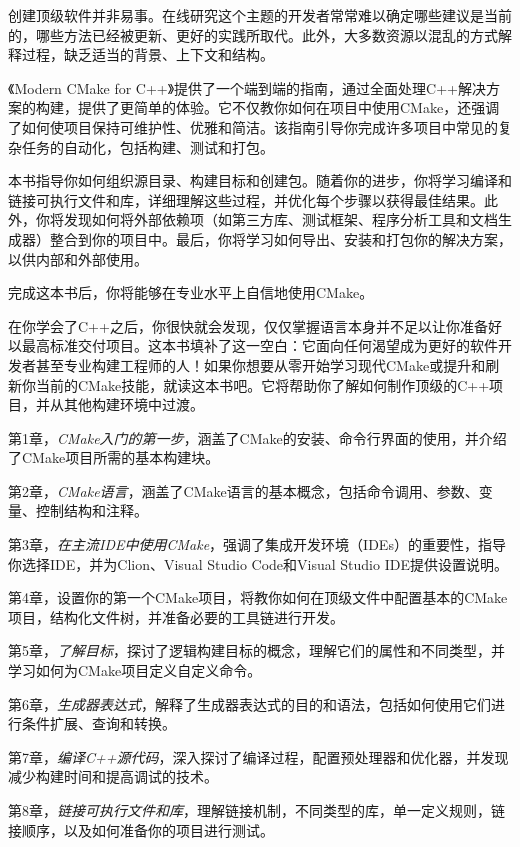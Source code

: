 


创建顶级软件并非易事。在线研究这个主题的开发者常常难以确定哪些建议是当前的，哪些方法已经被更新、更好的实践所取代。此外，大多数资源以混乱的方式解释过程，缺乏适当的背景、上下文和结构。

《Modern CMake for C++》提供了一个端到端的指南，通过全面处理C++解决方案的构建，提供了更简单的体验。它不仅教你如何在项目中使用CMake，还强调了如何使项目保持可维护性、优雅和简洁。该指南引导你完成许多项目中常见的复杂任务的自动化，包括构建、测试和打包。

本书指导你如何组织源目录、构建目标和创建包。随着你的进步，你将学习编译和链接可执行文件和库，详细理解这些过程，并优化每个步骤以获得最佳结果。此外，你将发现如何将外部依赖项（如第三方库、测试框架、程序分析工具和文档生成器）整合到你的项目中。最后，你将学习如何导出、安装和打包你的解决方案，以供内部和外部使用。

完成这本书后，你将能够在专业水平上自信地使用CMake。


在你学会了C++之后，你很快就会发现，仅仅掌握语言本身并不足以让你准备好以最高标准交付项目。这本书填补了这一空白：它面向任何渴望成为更好的软件开发者甚至专业构建工程师的人！如果你想要从零开始学习现代CMake或提升和刷新你当前的CMake技能，就读这本书吧。它将帮助你了解如何制作顶级的C++项目，并从其他构建环境中过渡。


第1章，\textit{CMake入门的第一步}，涵盖了CMake的安装、命令行界面的使用，并介绍了CMake项目所需的基本构建块。

第2章，\textit{CMake语言}，涵盖了CMake语言的基本概念，包括命令调用、参数、变量、控制结构和注释。

第3章，\textit{在主流IDE中使用CMake}，强调了集成开发环境（IDEs）的重要性，指导你选择IDE，并为Clion、Visual Studio Code和Visual Studio IDE提供设置说明。

第4章，设置你的第一个CMake项目，将教你如何在顶级文件中配置基本的CMake项目，结构化文件树，并准备必要的工具链进行开发。

第5章，\textit{了解目标}，探讨了逻辑构建目标的概念，理解它们的属性和不同类型，并学习如何为CMake项目定义自定义命令。

第6章，\textit{生成器表达式}，解释了生成器表达式的目的和语法，包括如何使用它们进行条件扩展、查询和转换。

第7章，\textit{编译C++源代码}，深入探讨了编译过程，配置预处理器和优化器，并发现减少构建时间和提高调试的技术。

第8章，\textit{链接可执行文件和库}，理解链接机制，不同类型的库，单一定义规则，链接顺序，以及如何准备你的项目进行测试。

